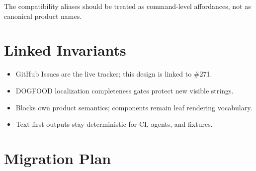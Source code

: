 The compatibility aliases should be treated as command-level affordances, not as canonical product names.

\section{Linked Invariants}\label{record-134-linked-invariants}

\begin{itemize}
\tightlist
\item
  GitHub Issues are the live tracker; this design is linked to \#271.
\item
  DOGFOOD localization completeness gates protect new visible strings.
\item
  Blocks own product semantics; components remain leaf rendering vocabulary.
\item
  Text-first outputs stay deterministic for CI, agents, and fixtures.
\end{itemize}

\section{Migration Plan}\label{record-134-migration-plan}


